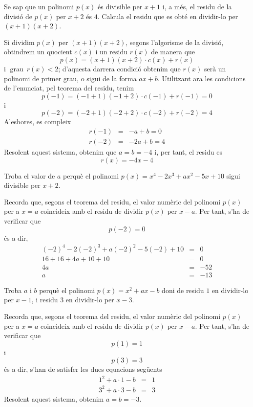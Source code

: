 \begin{exercici}
Se sap que un polinomi $p(x)$ és divisible per $x+1$ i, a més, el
residu de la divisió de $p(x)$ per $x+2$ és $4$. Calcula el residu que es
obté en dividir-lo per $(x+1)(x+2)$.
\end{exercici}

\begin{solucio}
Si dividim $p(x)$ per $(x+1)(x+2)$, segons l'algorisme de la divisió, obtindrem un quocient $c(x)$ i un residu $r(x)$ de manera que\[
p(x)=(x+1)(x+2)\cdot c(x)+r(x)
\]i $\operatorname{grau}~r(x)<2$; d'aquesta darrera condició obtenim que $r(x)$ serà un polinomi de primer grau, o sigui de la forma $ax+b$. Utilitzant
ara les condicions de l'enunciat, pel teorema del residu, tenim\[
p(-1)=(-1+1)(-1+2)\cdot c(-1)+r(-1)=0
\]i\[
p(-2)=(-2+1)(-2+2)\cdot c(-2)+r(-2)=4
\]Aleshores, es compleix\begin{eqnarray*}
r(-1) &=&-a+b=0 \\
r(-2) &=&-2a+b=4
\end{eqnarray*}Resolent aquest sistema, obtenim que $a=b=-4$ i, per tant, el residu es\[
r(x)=-4x-4
\]
\end{solucio}

\begin{exercici}
Troba el valor de $a$ perquè el polinomi $p(x)=x^{4}-2x^{3}+ax^{2}-5x+10$
sigui divisible per $x+2$.
\end{exercici}

\begin{solucio}
Recorda que, segons el teorema del residu, el valor numèric del
polinomi $p(x)$ per a $x=a$ coincideix amb el residu de dividir $p(x)$ per $x-a$. Per tant, s'ha de verificar que\[
p(-2)=0
\]és a dir,\begin{eqnarray*}
\left( -2\right) ^{4}-2\left( -2\right) ^{3}+a\left( -2\right) ^{2}-5\left(
-2\right) +10 &=&0 \\
16+16+4a+10+10 &=&0 \\
4a &=&-52 \\
a &=&-13
\end{eqnarray*}
\end{solucio}

\begin{exercici}
Troba $a$ i $b$ perquè el polinomi $p(x)=x^{2}+ax-b$ doni de residu $1$
en dividir-lo per $x-1$, i residu $3$ en dividir-lo per $x-3$.
\end{exercici}

\begin{solucio}
Recorda que, segons el teorema del residu, el valor numèric del
polinomi $p(x)$ per a $x=a$ coincideix amb el residu de dividir $p(x)$ per $x-a$. Per tant, s'ha de verificar que\[
p(1)=1
\]i\[
p(3)=3
\]és a dir, s'han de satisfer les dues equacions següents\begin{eqnarray*}
1^{2}+a\cdot 1-b &=&1 \\
3^{2}+a\cdot 3-b &=&3
\end{eqnarray*}Resolent aquest sistema, obtenim $a=b=-3$.
\end{solucio}

